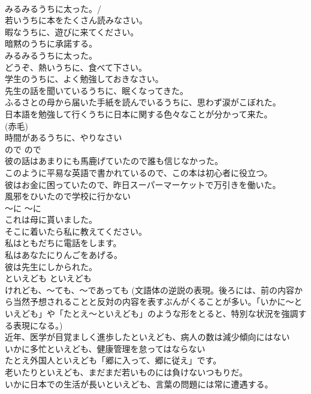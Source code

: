 \documentclass[8pt]{extreport}
\begin{document}
\begin{CJK}{UTF8}{min}
\\	みるみるうちに太った。/ 
\\	若いうちに本をたくさん読みなさい。  
\\	暇なうちに、遊びに来てください。  
\\	暗黙のうちに承諾する。  
\\	みるみるうちに太った。  
\\	どうぞ、熱いうちに、食べて下さい。   
\\	学生のうちに、よく勉強しておきなさい。  
\\	先生の話を聞いているうちに、眠くなってきた。  
\\	ふるさとの母から届いた手紙を読んでいるうちに、思わず涙がこぼれた。  
\\	日本語を勉強して行くうちに日本に関する色々なことが分かって来た。  
\\	(赤毛)
\\	時間があるうちに、やりなさい  
\\	ので	ので	
\\	彼の話はあまりにも馬鹿げていたので誰も信じなかった。  
\\	このように平易な英語で書かれているので、この本は初心者に役立つ。  
\\	彼はお金に困っていたので、昨日スーパーマーケットで万引きを働いた。  
\\	風邪をひいたので学校に行かない  
\\	〜に	〜に	
\\	これは母に貰いました。 
\\	そこに着いたら私に教えてください。  
\\	私はともだちに電話をします。  
\\	私はあなたにりんごをあげる。  
\\	彼は先生にしかられた。  
\\	といえども	といえども	
\\	けれども、〜ても、〜であっても (文語体の逆説の表現。後ろには、前の内容から当然予想されることと反対の内容を表すぶんがくることが多い。「いかに〜といえども」や「たとえ〜といえども」のような形をとると、特別な状況を強調する表現になる。)	
\\	近年、医学が目覚ましく進歩したといえども、病人の数は減少傾向にはない  
\\	いかに多忙といえども、健康管理を怠ってはならない  
\\	たとえ外国人といえども「郷に入って、郷に従え」です。  
\\	老いたりといえども、まだまだ若いものには負けないつもりだ。  
\\	いかに日本での生活が長いといえども、言葉の問題には常に遭遇する。  

\end{CJK}
\end{document}
